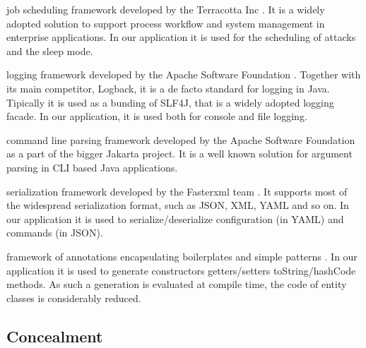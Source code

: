 \begin{description}
  \setlength\itemsep{1em}

  \item[QUARTZ] job scheduling framework developed by the Terracotta Inc \cite{quartz-scheduler}.
  It is a widely adopted solution to support process workflow and system management in enterprise applications.
  In our application it is used for the scheduling of attacks and the sleep mode.

  \item[LOG4J2] logging framework developed by the Apache Software Foundation \cite{log4j2}.
  Together with its main competitor, Logback, it is a de facto standard for logging in Java. Tipically it is used as a bunding of SLF4J, that is a widely adopted logging facade.
  In our application, it is used both for console and file logging.

  \item[COMMONS CLI] command line parsing framework developed by the Apache Software Foundation as a part of the bigger Jakarta project\cite{commons-cli}.
  It is a well known solution for argument parsing in CLI based Java applications.

  \item[JACKSON] serialization framework developed by the Fasterxml team \cite{jackson,fasterxml}.
  It supports most of the widespread serialization format, such as JSON, XML, YAML and so on.
  In our application it is used to serialize/deserialize configuration (in YAML) and commands (in JSON).

  \item[LOMBOK] framework of annotations encapsulating boilerplates and simple patterns \cite{lombok}.
  In our application it is used to generate constructors getters/setters toString/hashCode methods. As such a generation is evaluated at compile time, the code of entity classes is considerably reduced.

  \item[BOOTSTRAP] \textcolor{green}{\lipsum[1]}

  \item[JQUERY] \textcolor{green}{\lipsum[1]}

\end{description}


\subsection{Concealment}
\label{sec:concealment}

